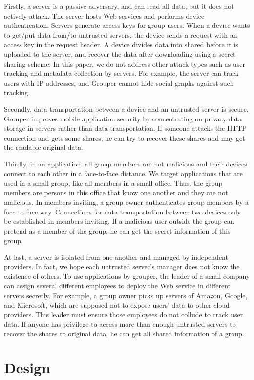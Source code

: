 \documentclass[twocolumn,10pt]{article}
\begin{document}
Firstly, a server is a passive adversary, and can read all data, but it does not actively attack.
The server hosts Web services and performs device authentication.
Servers generate access keys for group users. 
When a device wants to get/put data from/to untrusted servers, the device sends a request with an access key in the request header.
A device divides data into shared before it is uploaded to the server, and recover the data after downloading using a secret sharing scheme. 
In this paper, we do not address other attack types such as user tracking and metadata collection by servers. 
For example, the server can track users with IP addresses, and Grouper cannot hide social graphs against such tracking.

Secondly, data transportation between a device and an untrusted server is secure.
Grouper improves mobile application security by concentrating on privacy data storage in servers rather than data transportation.
If someone attacks the HTTP connection and gets some shares, he can try to recover these shares and may get the readable original data.

Thirdly, in an application, all group members are not malicious and their devices connect to each other in a face-to-face distance.
We target applications that are used in a small group, like all members in a small office.
Thus, the group members are persons in this office that know one another and they are not malicious.
In members inviting, a group owner authenticates group members by a face-to-face way.
Connections for data transportation between two devices only be established in members inviting.
If a malicious user outside the group can pretend as a member of the group, he can get the secret information of this group.

At last, a server is isolated from one another and managed by independent providers.
In fact, we hope each untrusted server’s manager does not know the existence of others.
To use applications by grouper, the leader of a small company can assign several different employees to deploy the Web service in different servers secretly. 
For example, a group owner picks up servers of Amazon, Google, and Microsoft, which are supposed not to expose users' data to other cloud providers.
This leader must ensure those employees do not collude to crack user data.
If anyone has privilege to access more than enough untrusted servers to recover the shares to original data, he can get all shared information of a group.

\section{Design}
\end{document}
